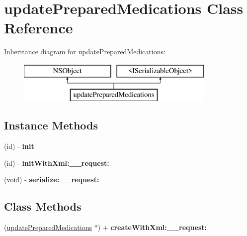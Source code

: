 \hypertarget{interfaceupdate_prepared_medications}{}\section{update\+Prepared\+Medications Class Reference}
\label{interfaceupdate_prepared_medications}
Inheritance diagram for update\+Prepared\+Medications\+:\begin{figure}[H]
\begin{center}
\leavevmode
\includegraphics[height=2.000000cm]{interfaceupdate_prepared_medications}
\end{center}
\end{figure}
\subsection*{Instance Methods}
\begin{DoxyCompactItemize}
\item 
\hypertarget{interfaceupdate_prepared_medications_a4162e7eb9e8035693ecc13f07d64487a}{}(id) -\/ {\bfseries init}\label{interfaceupdate_prepared_medications_a4162e7eb9e8035693ecc13f07d64487a}

\item 
\hypertarget{interfaceupdate_prepared_medications_ad658ea322484c8b76acadfd1fb44e709}{}(id) -\/ {\bfseries init\+With\+Xml\+:\+\_\+\+\_\+request\+:}\label{interfaceupdate_prepared_medications_ad658ea322484c8b76acadfd1fb44e709}

\item 
\hypertarget{interfaceupdate_prepared_medications_a34c870c2df5282e362b06b7bfaf57e2c}{}(void) -\/ {\bfseries serialize\+:\+\_\+\+\_\+request\+:}\label{interfaceupdate_prepared_medications_a34c870c2df5282e362b06b7bfaf57e2c}

\end{DoxyCompactItemize}
\subsection*{Class Methods}
\begin{DoxyCompactItemize}
\item 
\hypertarget{interfaceupdate_prepared_medications_ad0d03a214b7541ddd4558b1711ed5ad5}{}(\hyperlink{interfaceupdate_prepared_medications}{update\+Prepared\+Medications} $\ast$) + {\bfseries create\+With\+Xml\+:\+\_\+\+\_\+request\+:}\label{interfaceupdate_prepared_medications_ad0d03a214b7541ddd4558b1711ed5ad5}

\end{DoxyCompactItemize}

